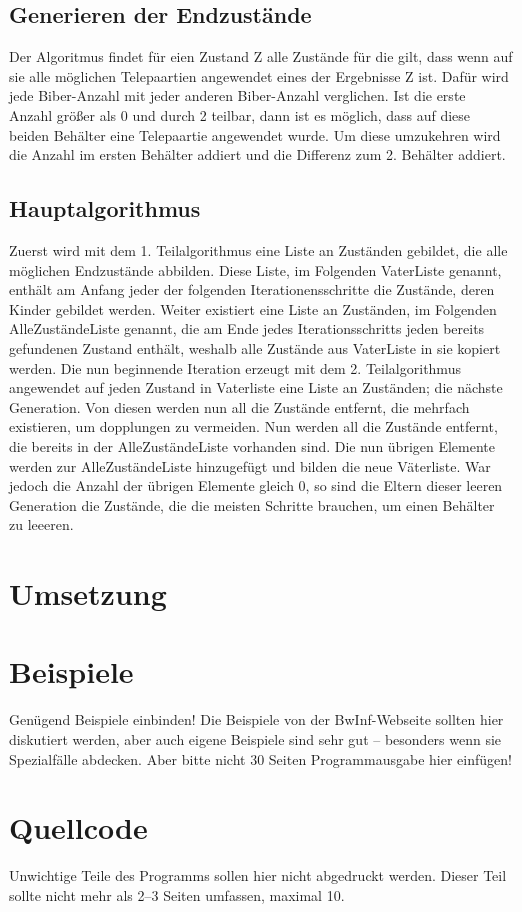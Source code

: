 \documentclass[a4paper,10pt,ngerman]{scrartcl}
\begin{document}
\subsection{Generieren der Endzustände} \label{endingStates}

Der Algoritmus findet für eien Zustand Z alle Zustände für die gilt, dass wenn auf sie alle möglichen Telepaartien angewendet eines der Ergebnisse Z ist. Dafür wird jede Biber-Anzahl mit jeder anderen Biber-Anzahl verglichen. Ist die erste Anzahl größer als 0 und durch 2 teilbar, dann ist es möglich, dass auf diese beiden Behälter eine Telepaartie angewendet wurde. Um diese umzukehren wird die Anzahl im ersten Behälter addiert und die Differenz zum 2. Behälter addiert.
\subsection{Hauptalgorithmus}
Zuerst wird mit dem 1. Teilalgorithmus eine Liste an Zuständen gebildet, die alle möglichen Endzustände abbilden. Diese Liste, im Folgenden VaterListe genannt, enthält am Anfang jeder der folgenden Iterationensschritte die Zustände, deren Kinder gebildet werden. Weiter existiert eine Liste an Zuständen, im Folgenden AlleZuständeListe genannt, die am Ende jedes Iterationsschritts jeden bereits gefundenen Zustand enthält, weshalb alle Zustände aus VaterListe in sie kopiert werden. Die nun beginnende Iteration erzeugt mit dem 2. Teilalgorithmus angewendet auf jeden Zustand in Vaterliste eine Liste an Zuständen; die nächste Generation. Von diesen werden nun all die Zustände entfernt, die mehrfach existieren, um dopplungen zu vermeiden. Nun werden all die Zustände entfernt, die bereits in der AlleZuständeListe vorhanden sind. Die nun übrigen Elemente werden zur AlleZuständeListe hinzugefügt und bilden die neue Väterliste. War jedoch die Anzahl der übrigen Elemente gleich 0, so sind die Eltern dieser leeren Generation die Zustände, die die meisten Schritte brauchen, um einen Behälter zu leeeren.

\section{Umsetzung}

\section{Beispiele}

Genügend Beispiele einbinden! Die Beispiele von der BwInf-Webseite sollten hier diskutiert werden, aber auch eigene Beispiele sind sehr gut – besonders wenn sie Spezialfälle abdecken. Aber bitte nicht 30 Seiten Programmausgabe hier einfügen!

\section{Quellcode}

Unwichtige Teile des Programms sollen hier nicht abgedruckt werden. Dieser Teil sollte nicht mehr als 2–3 Seiten umfassen, maximal 10.
\end{document}
